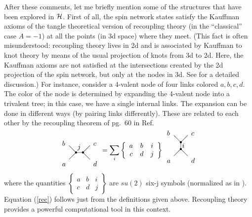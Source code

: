 \documentclass[12pt]{article}
\begin{document}
After these comments, let me briefly mention some of the 
structures that have been explored in $\cal H$. 
First of all, the spin network states satisfy the Kauffman axioms 
of the tangle theoretical version of recoupling theory 
\cite{Kauffman94} (in the ``classical'' case $A=-1$) at all the 
points (in 3d space) where they meet.  (This fact is 
often misunderstood: recoupling theory lives in 2d and is 
associated by Kauffman to knot theory by means of the usual 
projection of knots from 3d to 2d.  Here, the Kauffman axioms 
are not satisfied at the intersections created by the 2d 
projection of the spin network, but only at the nodes 
in 3d.  See \cite{DePietriRovelli} for a detailed discussion.)  
For instance, consider a 4-valent node of four links 
colored $a, b, c, d$.  The color of the node is determined by 
expanding the 4-valent node into a trivalent tree; in 
this case, we have a single internal links.  The expansion can be 
done in different ways (by pairing links differently).  These are 
related to each other by the recoupling theorem of pg.\ 60 in 
Ref.\ \cite{Kauffman94}
\begin{equation}
\begin{array}{c}\setlength{\unitlength}{1 pt}
\begin{picture}(50,50)
          \put( 0,0){$a$}\put( 0,30){$b$}
          \put(45,0){$d$}\put(45,30){$c$}
          \put(10,10){\line(1,1){10}}\put(10,30){\line(1,-1){10}}
          \put(30,20){\line(1,1){10}}\put(30,20){\line(1,-1){10}}
           \put(20,20){\line(1,0){10}}\put(22,25){$j$}
          \put(20,20){\circle*{3}}\put(30,20){\circle*{3}}
\end{picture}\end{array}
    = \sum_i  \left\{\begin{array}{ccc}
                      a  & b & i \\
                      c  & d & j
              \end{array}\right\}
\begin{array}{c}\setlength{\unitlength}{1 pt}
\begin{picture}(40,40)
      \put( 0,0){$a$}\put( 0,40){$b$}
      \put(35,0){$d$}\put(35,40){$c$}
     \put(10,10){\line(1,1){10}}\put(10,40){\line(1,-1){10}}
      \put(20,30){\line(1,1){10}}\put(20,20){\line(1,-1){10}}
      \put(20,20){\line(0,1){10}}\put(22,22){$i$}
      \put(20,20){\circle*{3}}\put(20,30){\circle*{3}}
\end{picture}\end{array}
\label{rec}
\end{equation}
where the quantities 
$\left\{\begin{array}{ccc}
a & b & i \\ c & d & j  \end{array}\right\}$ 
are $su(2)$
six-j symbols (normalized as in \cite{Kauffman94}). Equation 
(\ref{rec}) follows just from the definitions given above. Recoupling 
theory provides a powerful computational tool in this context. 
\end{document}
